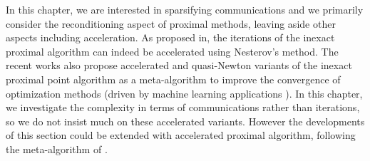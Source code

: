 \begin{remark}\label{rem:cata}
In this chapter, we are interested in sparsifying communications and we primarily consider the reconditioning aspect of proximal methods, leaving aside other aspects including acceleration. As proposed in\;\cite{guler1992new}, the iterations of the inexact proximal algorithm can indeed be accelerated using Nesterov's method\;\cite{nesterov1983method}.
The recent works\;\cite{lin2017catalyst,lin2019inexact} also propose accelerated and quasi-Newton variants of the inexact proximal point algorithm as a meta-algorithm to improve the convergence of optimization methods (driven by machine learning applications \cite{lin2015universal}). 
In this chapter, we investigate the complexity in terms of communications rather than iterations, so we do not insist much on these accelerated variants. However the developments of this section could be extended with accelerated proximal algorithm, following the meta-algorithm of \cite{lin2017catalyst}.
\end{remark}